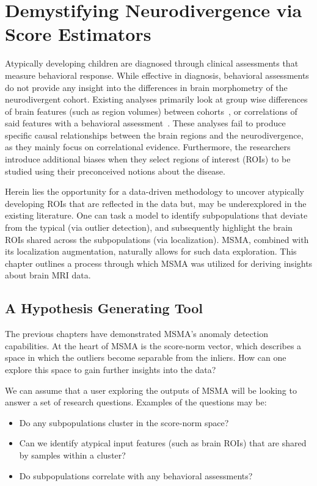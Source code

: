 \chapter{Demystifying Neurodivergence via Score Estimators }
\label{ch:localizing}

Atypically developing children are diagnosed through clinical assessments that measure behavioral response. While effective in diagnosis, behavioral assessments do not provide any insight into the differences in brain morphometry of the neurodivergent cohort. Existing analyses primarily look at group wise differences of brain features (such as region volumes) between cohorts~\cite{giraultNeurodevelopmentAutismInfancy2020,hamnerPediatricBrainDevelopment2018}, or correlations of said features with a behavioral assessment~\cite{shenSubcorticalBrainDevelopment2022,brainsci12040439}. These analyses fail to produce specific causal relationships between the brain regions and the neurodivergence, as they mainly focus on correlational evidence.
Furthermore, the researchers introduce additional biases when they select regions of interest (ROIs) to be studied using their preconceived notions about the disease.

Herein lies the opportunity for a data-driven methodology to uncover atypically developing ROIs that are reflected in the data but, may be underexplored in the existing  literature. One can task a model to identify subpopulations that deviate from the typical (via outlier detection), and subsequently highlight the brain ROIs shared across the subpopulations (via localization).  MSMA, combined with its localization augmentation, naturally allows for such data exploration. This chapter outlines a process through which MSMA was utilized for deriving insights about brain MRI data.

\section{A Hypothesis Generating Tool}

The previous chapters have demonstrated MSMA's anomaly detection capabilities. At the heart of MSMA is the score-norm vector, which describes a space in which the outliers become separable from the inliers. How can one explore this space to gain further insights into the data?

We can assume that a user exploring the outputs of MSMA will be looking to answer a set of research questions. Examples of the questions may be:
\begin{itemize}
    \item Do any subpopulations cluster in the score-norm space?
    \item Can we identify atypical input features (such as brain ROIs)  that are shared by samples within a cluster?
    \item Do subpopulations correlate with any behavioral assessments?
\end{itemize}

